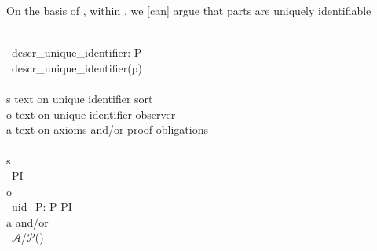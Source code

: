 \begynd
\pind On the basis of , within , 
\begynd
\pind we [can] argue that parts are uniquely identifiable
     \cite[]{kaisorlander1994,kaisorlander1997,kaisorlander2002,kaisorlander2016,kaisorlander2022} 
\afslut
\afslut

\label{Calculate Unique Identifiers}

\bp
{} \\
\>\ descr\_unique\_identifier: P {\RIGHTARROW} \rsltext\\
\>\ descr\_unique\_identifier(p) {\IS}\\
\>\>\>\bq {}\\
\>\>\>\>\>{\LBRACKET}s{\RBRACKET} text on unique identifier sort\\
\>\>\>\>\>{\LBRACKET}o{\RBRACKET} text on unique identifier observer\\
\>\>\>\>\>{\LBRACKET}a{\RBRACKET} text on axioms and/or proof obligations\\
\>\>\>\ \,\,\\
\>\>\>\>\>{\LBRACKET}s{\RBRACKET}  \\
\>\>\>\>\>\>\>\>\ PI\\
\>\>\>\>\>{\LBRACKET}o{\RBRACKET}  \\
\>\>\>\>\>\>\>\>\ uid\_P: P {\RIGHTARROW} PI\\
\>\>\>\>\>{\LBRACKET}a{\RBRACKET}  and/or \\
\>\>\>\>\>\>\>\>\ $\mathcal{A}$/$\mathcal{P}$({\DOTDOTDOT}) \eq
\ep
\eff


